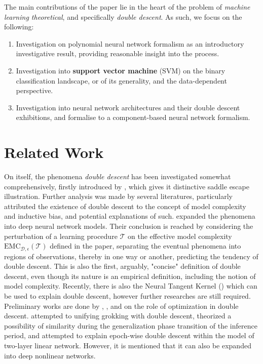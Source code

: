 \documentclass[10pt]{article} %
\begin{document}
The main contributions of the paper lie in the heart of the problem of \textit{machine learning theoretical}, and specifically \textit{double descent}. As such, we focus on the following:

\begin{enumerate}
    \item Investigation on polynomial neural network formalism as an introductory investigative result, providing reasonable insight into the process. 
    \item Investigation into \textbf{support vector machine} (SVM) on the binary classification landscape, or of its generality, and the data-dependent perspective. 
    \item Investigation into neural network architectures and their double descent exhibitions, and formalise to a component-based neural network formalism. 
\end{enumerate}

\section{Related Work}

On itself, the phenomena \textit{double descent} has been investigated somewhat comprehensively, firstly introduced by \cite{belkin_reconciling_2019}, which gives it distinctive saddle escape illustration. Further analysis was made by several literatures, particularly attributed the existence of double descent to the concept of model complexity and inductive bias, and potential explanations of such. \cite{nakkiran_deep_2019} expanded the phenomena into deep neural network models. Their conclusion is reached by considering the perturbation of a learning procedure $\mathcal{T}$ on the effective model complexity $\mathrm{EMC}_{\mathcal{D},\epsilon}(\mathcal{T})$ defined in the paper, separating the eventual phenomena into regions of observations, thereby in one way or another, predicting the tendency of double descent. This is also the first, arguably, "concise" definition of double descent, even though its nature is an empirical definition, including the notion of model complexity. Recently, there is also the Neural Tangent Kernel (\cite{Jacot:2018:NTK}) which can be used to explain double descent, however further researches are still required. Preliminary works are done by \cite{lafon_understanding_2024}, \cite{schaeffer_double_2023}, and \cite{liu2023understandingroleoptimizationdouble} on the role of optimization in double descent. \cite{davies_unifying_2023} attempted to unifying grokking with double descent, theorized a possibility of similarity during the generalization phase transition of the inference period, and \cite{olmin2024understandingepochwisedoubledescent} attempted to explain epoch-wise double descent within the model of two-layer linear network. However, it is mentioned that it can also be expanded into deep nonlinear networks. 
\end{document}
